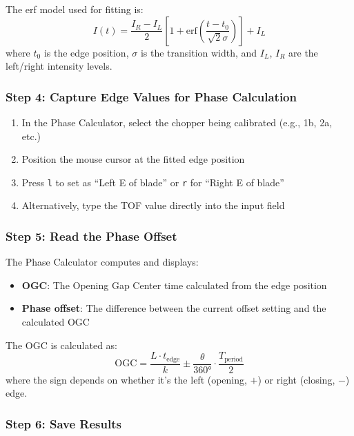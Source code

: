 \documentclass[tm]{ornltm}
\begin{document}
The erf model used for fitting is:
\begin{equation}
    I(t) = \frac{I_R - I_L}{2} \left[ 1 + \text{erf}\left(\frac{t - t_0}{\sqrt{2}\sigma}\right) \right] + I_L
\end{equation}
where $t_0$ is the edge position, $\sigma$ is the transition width, and $I_L$, $I_R$ are the left/right intensity levels.

\subsubsection{Step 4: Capture Edge Values for Phase Calculation}

\begin{enumerate}
    \item In the Phase Calculator, select the chopper being calibrated (e.g., 1b, 2a, etc.)
    \item Position the mouse cursor at the fitted edge position
    \item Press \texttt{l} to set as ``Left E of blade'' or \texttt{r} for ``Right E of blade''
    \item Alternatively, type the TOF value directly into the input field
\end{enumerate}

\subsubsection{Step 5: Read the Phase Offset}

The Phase Calculator computes and displays:
\begin{itemize}
    \item \textbf{OGC}: The Opening Gap Center time calculated from the edge position
    \item \textbf{Phase offset}: The difference between the current offset setting and the calculated OGC
\end{itemize}

The OGC is calculated as:
\begin{equation}
    \text{OGC} = \frac{L \cdot t_{\text{edge}}}{k} \pm \frac{\theta}{360°} \cdot \frac{T_{\text{period}}}{2}
\end{equation}
where the sign depends on whether it's the left (opening, $+$) or right (closing, $-$) edge.

\subsubsection{Step 6: Save Results}
\end{document}
